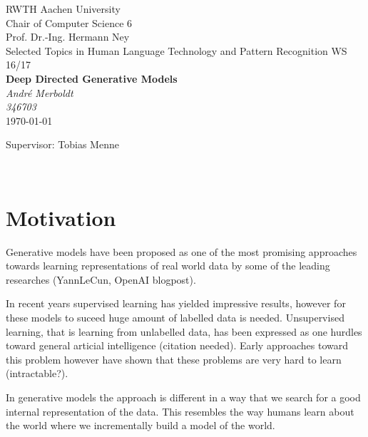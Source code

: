 \documentclass[twoside,11pt,a4paper]{article}
\theoremstyle{break}
\begin{document}
\pagestyle{empty}

\begin{center}

    RWTH Aachen University\\
    Chair of Computer Science 6 \\
    Prof. Dr.-Ing. Hermann Ney\\[6ex]
    Selected Topics in Human Language Technology and Pattern Recognition WS 16/17\\[12ex]

    \LARGE
    \textbf{Deep Directed Generative Models} \\[6ex]
    \textit{André Merboldt} \\[6ex]
    \textit{346703} \\[6ex]
    \today

    \vfill
    \Large Supervisor: Tobias Menne
\end{center}

\newpage
\
\newpage


\pagestyle{headings}
\tableofcontents
\listoftables
\listoffigures
\newpage
\pagestyle{headings}







\section{Motivation}
\label{sec:motivation}
Generative models have been proposed as one of the most promising approaches towards
learning representations of real world data by some of the leading researches (YannLeCun, OpenAI blogpost).

In recent years supervised learning has yielded impressive results,
however for these models to suceed huge amount of labelled data is needed.
Unsupervised learning, that is learning from unlabelled data, has been expressed
as one hurdles toward general articial intelligence (citation needed).
Early approaches toward this problem however have shown that these problems are very hard to learn (intractable?).

In generative models the approach is different in a way that
we search for a good internal representation of the data.
This resembles the way humans learn about the world where we incrementally build
a model of the world.
\end{document}
